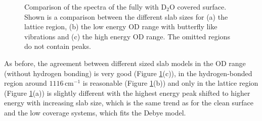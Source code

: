 \documentclass[11pt,DIV=13,BCOR=5mm,a4paper,headinclude]{scrbook}
\begin{document}
 \begin{figure} [!h]
 \centering
              \quad
              \quad
 \caption{Comparison of the spectra of the fully with D$_2$O covered surface.
Shown is a comparison between the different slab sizes for (a) the lattice region, (b) the low energy OD range with butterfly like vibrations and (c) the high energy OD range.
The omitted regions do not contain peaks.} 
        \label{abb:fullyhydrox_spec}
\end{figure}
As before, the agreement between different sized slab models in the OD range (without hydrogen bonding) is very good (Figure \ref{abb:fullyhydrox_spec}(c)), in the hydrogen-bonded region around $1116\,$cm$^{-1}$ is reasonable (Figure \ref{abb:fullyhydrox_spec}(b)) and only in the lattice region (Figure \ref{abb:fullyhydrox_spec}(a)) is slightly different with the highest energy peak shifted to higher energy with increasing slab size, which is the same trend as for the clean surface and the low coverage systems, which fits the Debye model.
\end{document}
